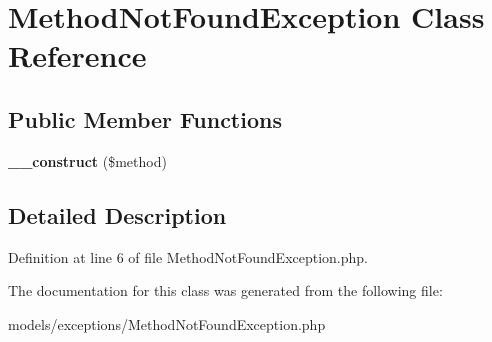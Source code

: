 \hypertarget{class_method_not_found_exception}{
\section{MethodNotFoundException Class Reference}
\label{class_method_not_found_exception}
}
\subsection*{Public Member Functions}
\begin{DoxyCompactItemize}
\item 
\hypertarget{class_method_not_found_exception_a70dd496bf6d2578f82c042a614b0be2d}{
{\bfseries \_\-\_\-construct} (\$method)}
\label{class_method_not_found_exception_a70dd496bf6d2578f82c042a614b0be2d}

\end{DoxyCompactItemize}


\subsection{Detailed Description}


Definition at line 6 of file MethodNotFoundException.php.



The documentation for this class was generated from the following file:\begin{DoxyCompactItemize}
\item 
models/exceptions/MethodNotFoundException.php\end{DoxyCompactItemize}
